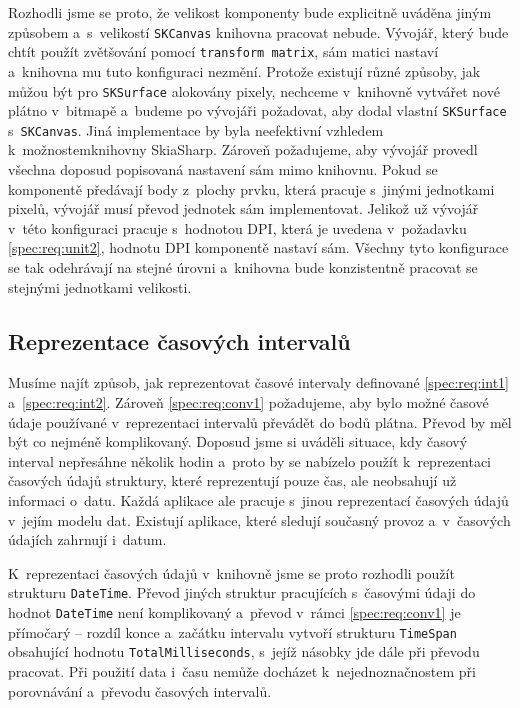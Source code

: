 Rozhodli jsme se proto, že velikost komponenty bude explicitně uváděna jiným způsobem a~s~velikostí \texttt{SKCanvas} knihovna pracovat nebude. Vývojář, který bude chtít použít zvětšování pomocí \texttt{transform matrix}, sám matici nastaví a~knihovna mu tuto konfiguraci nezmění. Protože existují různé způsoby, jak můžou být pro \texttt{SKSurface} alokovány pixely, nechceme v~knihovně vytvářet nové plátno v~bitmapě a~budeme po vývojáři požadovat, aby dodal vlastní \texttt{SKSurface} \linebreak s~\texttt{SKCanvas}. Jiná implementace by byla neefektivní vzhledem k~možnostem\linebreak knihovny SkiaSharp. Zároveň požadujeme, aby vývojář provedl všechna doposud popisovaná nastavení sám mimo knihovnu. Pokud se komponentě předávají body z~plochy prvku, která pracuje s~jinými jednotkami pixelů, vývojář musí převod jednotek sám implementovat. Jelikož už vývojář v~této konfiguraci pracuje s~hodnotou DPI, která je uvedena v~požadavku \ref{spec:req:unit2}, hodnotu DPI komponentě nastaví sám. Všechny tyto konfigurace se tak odehrávají na stejné úrovni a~knihovna bude konzistentně pracovat se stejnými jednotkami velikosti.

\subsection{Reprezentace časových intervalů}
Musíme najít způsob, jak reprezentovat časové intervaly definované \ref{spec:req:int1} a~\ref{spec:req:int2}. Zároveň \ref{spec:req:conv1} požadujeme, aby bylo možné časové údaje používané v~reprezentaci intervalů převádět do bodů plátna. Převod by měl být co nejméně komplikovaný. Doposud jsme si uváděli situace, kdy časový interval nepřesáhne několik hodin a~proto by se nabízelo použít k~reprezentaci časových údajů struktury, které reprezentují pouze čas, ale neobsahují už informaci o~datu. Každá aplikace ale pracuje s~jinou reprezentací časových údajů v~jejím modelu dat. Existují aplikace, které sledují současný provoz a~v~časových údajích zahrnují i~datum.

K~reprezentaci časových údajů v~knihovně jsme se proto rozhodli použít strukturu \texttt{DateTime}. Převod jiných struktur pracujících s~časovými údaji do hodnot \texttt{DateTime} není komplikovaný a~převod v~rámci \ref{spec:req:conv1} je přímočarý -- rozdíl konce a~začátku intervalu vytvoří strukturu \texttt{TimeSpan} obsahující hodnotu \texttt{TotalMilliseconds}, s~jejíž násobky jde dále při převodu pracovat. Při použití data i~času nemůže docházet k~nejednoznačnostem při porovnávání a~převodu časových intervalů.

